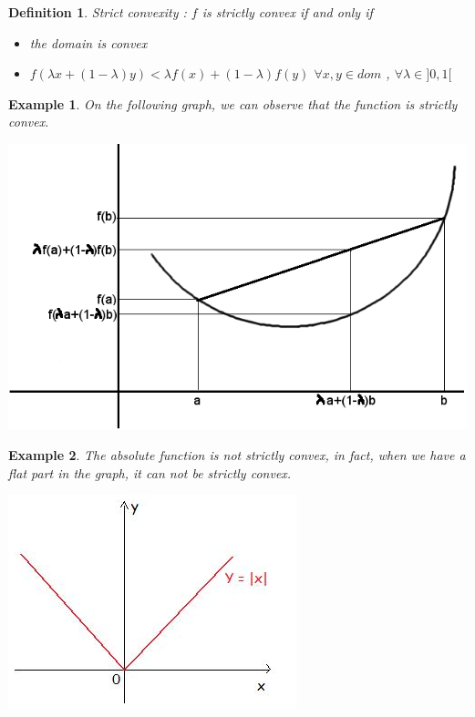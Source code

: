 \documentclass[12pt,a4paper]{article}
\newtheorem{exmp}{Example}[section]
\newtheorem{defi}{Definition}
\begin{document}
 \begin{defi}
 Strict convexity : $f$ is strictly convex if and only if 
 \begin{itemize}
 \item the domain is convex
 \item $f(\lambda x + (1-\lambda)y)<\lambda f(x) + (1-\lambda) f(y)$ $\forall x,y \in dom$ , $\forall \lambda \in ]0,1[$
 \end{itemize}
 \end{defi}
 \begin{exmp}
 On the following graph, we can observe that the function is strictly convex.
 \begin{center}
 \includegraphics[scale=0.4]{courbe}
 \end{center}
 \end{exmp}
\begin{exmp}
The absolute function is not strictly convex, in fact, when we have a flat part in the graph, it can not be strictly convex.
\begin{center}
  \includegraphics[scale=0.5]{absolue}
\end{center}
\end{exmp}
\end{document}
